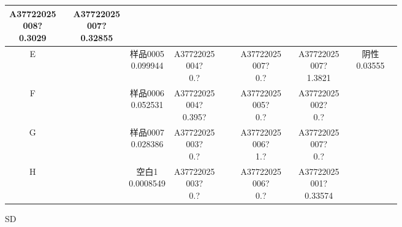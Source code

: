 \documentclass[UTF8,10pt,a4paper,fontset=fandol]{ctexart}
\begin{document}
{\begin{tabular}{c|*{12}{c|}}
\shortstack{A37722025\\008?\\0.3029} & &
\shortstack{A37722025\\007?\\0.32855} & & & \\ \hline
E & & &
\shortstack{样品0005\\0.099944} &
\shortstack{A37722025\\004?\\0.?} & & &
\shortstack{A37722025\\007?\\0.?} & &
\shortstack{A37722025\\007?\\1.3821} & &
\shortstack{阴性\\0.03555} & \\ \hline
F & & &
\shortstack{样品0006\\0.052531} &
\shortstack{A37722025\\004?\\0.395?} & & &
\shortstack{A37722025\\005?\\0.?} & &
\shortstack{A37722025\\002?\\0.?} & & & \\ \hline
G & & &
\shortstack{样品0007\\0.028386} &
\shortstack{A37722025\\003?\\0.?} & & &
\shortstack{A37722025\\006?\\1.?} & &
\shortstack{A37722025\\007?\\0.?} & & & \\ \hline
H & & &
\shortstack{空白1\\0.0008549} &
\shortstack{A37722025\\003?\\0.?} & & &
\shortstack{A37722025\\006?\\0.?} & &
\shortstack{A37722025\\001?\\0.33574} & & & \\ \hline
\end{tabular}%
}

\medskip
\noindent SD
\end{document}
